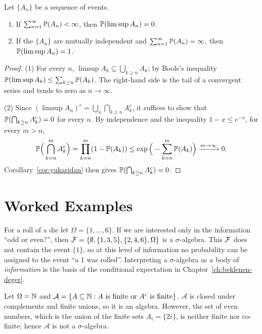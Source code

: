 \documentclass[main.tex]{subfiles}
\begin{document}
\begin{theorem}\label{thm:borel-cantelli}
Let $\{A_n\}$ be a sequence of events.
\begin{enumerate}
  \item If $\sum_{n=1}^\infty \P(A_n)<\infty$, then $\P(\limsup A_n)=0$.
  \item If the $\{A_n\}$ are mutually independent and $\sum_{n=1}^\infty \P(A_n)=\infty$, then $\P(\limsup A_n)=1$.
\end{enumerate}
\end{theorem}
\begin{proof}
(1) For every $n$, $\limsup A_k\subseteq\bigcup_{k\ge n}A_k$; by Boole's inequality $\P(\limsup A_k)\le\sum_{k\ge n}\P(A_k)$. The right-hand side is the tail of a convergent series and tends to zero as $n\to\infty$.

(2) Since $(\limsup A_n)^c=\bigcup_n\bigcap_{k\ge n}A_k^c$, it suffices to show that $\P(\bigcap_{k\ge n}A_k^c)=0$ for every $n$. By independence and the inequality $1-x\le e^{-x}$, for every $m>n$,
\[
\P\Big(\bigcap_{k=n}^{m}A_k^c\Big)=\prod_{k=n}^{m}(1-\P(A_k))\le \exp\Big(-\sum_{k=n}^m\P(A_k)\Big)\xrightarrow{m\to\infty}0 .
\]
Corollary~\ref{cor:yukaridan} then gives $\P(\bigcap_{k\ge n}A_k^c)=0$.
\end{proof}

\section{Worked Examples}

\begin{example}
For a roll of a die let $\Omega=\{1,\dots,6\}$. If we are interested only in the information ``odd or even?'', then $\F=\{\emptyset,\{1,3,5\},\{2,4,6\},\Omega\}$ is a $\sigma$-algebra. This $\F$ does not contain the event $\{1\}$, so at this level of information no probability can be assigned to the event ``a 1 was rolled''. Interpreting a $\sigma$-algebra as a body of \emph{information} is the basis of the conditional expectation in Chapter~\ref{ch:beklenen-deger}.
\end{example}

\begin{example}
Let $\Omega=\N$ and $\mathcal{A}=\{A\subseteq\N: A \text{ is finite or } A^c \text{ is finite}\}$. $\mathcal{A}$ is closed under complements and finite unions, so it is an algebra. However, the set of even numbers, which is the union of the finite sets $A_i=\{2i\}$, is neither finite nor co-finite; hence $\mathcal{A}$ is not a $\sigma$-algebra.
\end{example}
\end{document}
